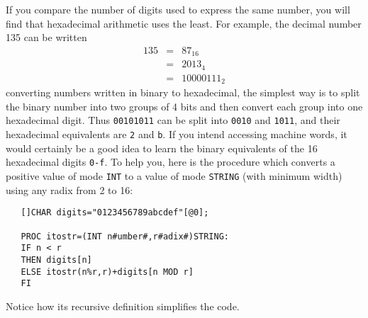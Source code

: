 If you compare the number of digits used to express the same number,
you will find that hexadecimal arithmetic uses the least. For
example, the decimal number 135 can be written
\begin{eqnarray*}
    135&=&87_{16}\\
       &=&2013_4\\
       &=&10000111_2
\end{eqnarray*}
 converting numbers written in binary to
hexadecimal, the simplest way is to split the binary number into two
groups of 4 bits and then convert each group into one hexadecimal
digit.  Thus \verb|00101011| can be split into \verb|0010| and
\verb|1011|, and their hexadecimal equivalents are \verb|2| and
\verb|b|.  If you intend accessing machine words, it would certainly be
a good idea to learn the binary equivalents of the 16 hexadecimal
digits \verb|0-f|.  To help you, here is the procedure
 which converts a positive value of
mode \verb|INT| to a value of mode \verb|STRING| (with minimum width)
using any radix from 2 to 16:
\begin{verbatim}
   []CHAR digits="0123456789abcdef"[@0];
   
   PROC itostr=(INT n#umber#,r#adix#)STRING:
   IF n < r
   THEN digits[n]
   ELSE itostr(n%r,r)+digits[n MOD r]
   FI
\end{verbatim}
\noindent
Notice how its recursive definition simplifies the code.


